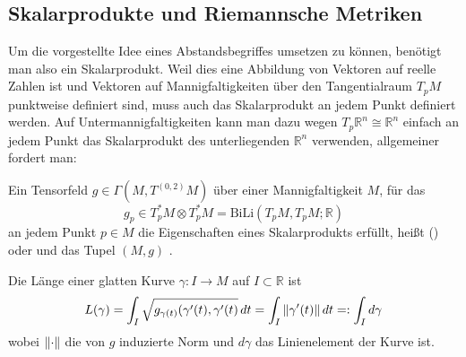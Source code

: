 \documentclass[../H_Analysis_main.tex]{subfiles}
\begin{document}
		\subsection{Skalarprodukte und Riemannsche Metriken}%
Um die vorgestellte Idee eines Abstandsbegriffes umsetzen zu können, benötigt man also ein Skalarprodukt. Weil dies eine Abbildung von Vektoren auf reelle Zahlen ist und Vektoren auf Mannigfaltigkeiten über den Tangentialraum $T_p M$ punktweise definiert sind, muss auch das Skalarprodukt an jedem Punkt definiert werden. Auf Untermannigfaltigkeiten kann man dazu wegen $T_p \mathbb{R}^n \cong \mathbb{R}^n$ einfach an jedem Punkt das Skalarprodukt des unterliegenden $\mathbb{R}^n$ verwenden, allgemeiner fordert man:
\begin{defi}
Ein Tensorfeld $g \in \Gamma(M, T^{(0, 2)} M)$ über einer Mannigfaltigkeit $M$, für das
\begin{equation}
g_p \in T_p^* M \otimes T_p^* M = \text{BiLi}(T_p M, T_p M; \mathbb{R})
\end{equation}
an jedem Punkt $p \in M$ die Eigenschaften eines Skalarprodukts erfüllt, heißt  () oder  und das Tupel $(M, g)$ .


Die Länge einer glatten Kurve $\gamma: I \rightarrow M$ auf $I \subset \mathbb{R}$ ist
\begin{equation}
L(\gamma) = \int_I \sqrt{g_{\gamma(t)}(\gamma'(t), \gamma'(t)} \, dt = \int_I \norm{\gamma'(t)} \, dt =: \int_I d\gamma
\end{equation}
wobei $\norm{\cdot}$ die von $g$ induzierte Norm und $d\gamma$ das Linienelement der Kurve ist.
\end{defi}

\end{document}
